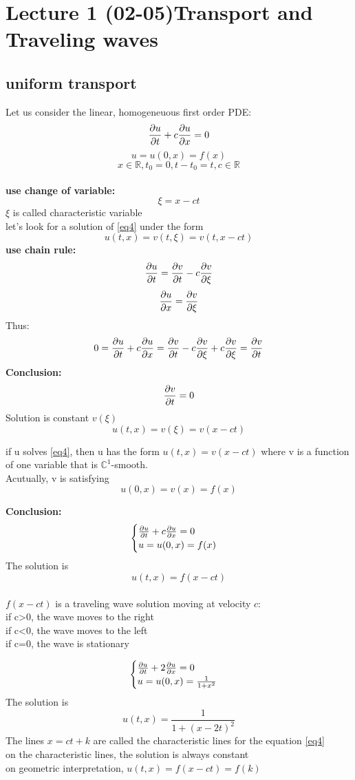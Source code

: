 \section[Lecture 2 (02-05) -- {Uniform Transport and Traveling waves}]{Lecture 1 (02-05)Transport and Traveling waves}
\subsection{uniform transport}
Let us consider the linear, homogeneuous first order PDE:
\begin{equation}
    \label{eq4} \pdv{u}{t}+c\pdv{u}{x}=0
\end{equation}
\begin{equation}
    \label{eq5} u=u(0,x)=f(x)
\end{equation}
$$
    x\in \mathbb{R},t_0=0,t-t_0=t,c\in \mathbb{R}
$$ 
\\\textbf{use change of variable:}  
$$
    \xi =x-ct
$$ 
$ \xi $ is called characteristic variable
\\let's look for a solution of \eqref{eq4} under the form $$ u(t,x)=v(t,\xi)=v(t,x-ct) $$ 
\textbf{use chain rule:}
$$
    \pdv{u}{t}=\pdv{v}{t}-c\pdv{v}{\xi}
$$ 
$$
    \pdv{u}{x}=\pdv{v}{\xi}
$$ 
Thus:
$$
    0=\pdv{u}{t}+c\pdv{u}{x}=\pdv{v}{t}-c\pdv{v}{\xi}+c\pdv{v}{\xi}= \pdv{v}{t}
$$ 
\textbf{Conclusion:}$$
    \pdv{v}{t}=0
$$ 
Solution is constant $ v(\xi) $
$$
u(t,x)=v(\xi)=v(x-ct)
$$  
\begin{proposition}{}{}
if u solves \eqref{eq4}, then u has the form $u(t,x)=v(x-ct)$ where v is a function of one variable that is $ \mathbb{C}^1 $-smooth.
\\Acutually, v is satisfying $$
    u(0,x)=v(x)=f(x)
$$ 
\end{proposition}
\textbf{Conclusion:}
$$\begin{cases}
    \pdv{u}{t}+c\pdv{u}{x}=0
    \\ 
    u=u(0,x)=f(x)
\end{cases}$$
The solution is $$ u(t,x)=f(x-ct) $$ 
\\$ f(x-ct) $ is a traveling wave solution moving at velocity $ c $:
\\if c>0, the wave moves to the right
\\if c<0, the wave moves to the left
\\if c=0, the wave is stationary 
\begin{example}{}{}
$$\begin{cases}
    \pdv{u}{t}+2\pdv{u}{x}=0
    \\ 
    u=u(0,x)=\frac{1}{1+x^2}
\end{cases}$$
The solution is $$ u(t,x)=\frac{1}{1+(x-2t)^2} $$
The lines $ x=ct+k $ are called the characteristic lines for the equation \eqref{eq4}
\\on the characteristic lines, the solution is always constant
\\on geometric interpretation, $u(t,x)=f(x-ct)=f(k)$
\end{example}
